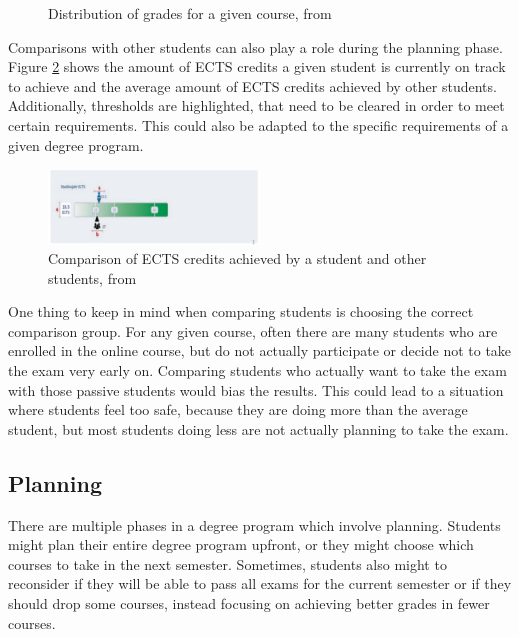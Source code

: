 \begin{figure}
\begin{minipage}[b]{0.4\textwidth}
        \caption{Distribution of grades for a given course, from \cite{Dashboard-StudentProgress}}
        \label{fig:comparison_course.png}
    \end{minipage}


\end{figure}

Comparisons with other students can also play a role during the planning phase. Figure \ref{fig:comparison_ects.png} shows the amount of ECTS credits a given student is currently on track to achieve and the average amount of ECTS credits achieved by other students.
Additionally, thresholds are highlighted, that need to be cleared in order to meet certain requirements. This could also be adapted to the specific requirements of a given degree program.

\begin{figure}
    \centering
    \includegraphics[width=0.5\textwidth]{figures/comp_ects.png}
    \caption{Comparison of ECTS credits achieved by a student and other students, from \cite{Dashboard-StudentProgress}}
    \label{fig:comparison_ects.png}
\end{figure}



One thing to keep in mind when comparing students is choosing the correct comparison group.
For any given course, often there are many students who are enrolled in the online course, but do not actually participate or decide not to take the exam very early on.
Comparing students who actually want to take the exam with those passive students would bias the results. This could lead to a situation where students feel too safe, because they are doing more than the average student, but most students doing less are not actually planning to take the exam.

\subsection{Planning}
\label{subsec:planning}

There are multiple phases in a degree program which involve planning. Students might plan their entire degree program upfront, or they might choose which courses to take in the next semester.
Sometimes, students also might to reconsider if they will be able to pass all exams for the current semester or if they should drop some courses, instead focusing on achieving better grades in fewer courses.

